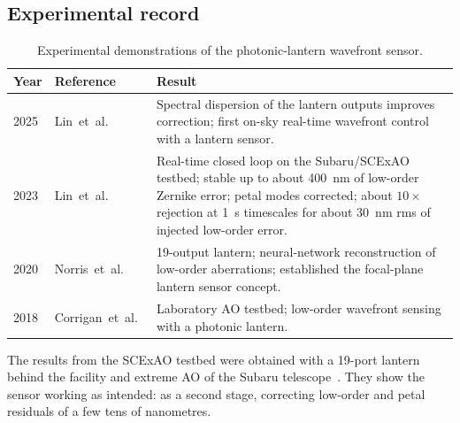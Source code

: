 \documentclass[11pt,a4paper]{article}
\begin{document}
\subsection{Experimental record}
\begin{table}[h]
\centering
\caption{Experimental demonstrations of the photonic-lantern wavefront sensor.}
\label{tab:experiments}
\small
\begin{tabular}{@{}llp{7cm}@{}}
\toprule
Year & Reference & Result \\
\midrule
2025 & Lin~et~al.~\cite{Lin2025} & Spectral dispersion of the lantern outputs improves correction; first on-sky real-time wavefront control with a lantern sensor. \\
2023 & Lin~et~al.~\cite{Lin2023PRL} & Real-time closed loop on the Subaru/SCExAO testbed; stable up to about \SI{400}{\nano\meter} of low-order Zernike error; petal modes corrected; about $10\times$ rejection at \SI{1}{\second} timescales for about \SI{30}{\nano\meter} rms of injected low-order error. \\
2020 & Norris~et~al.~\cite{Norris2020} & 19-output lantern; neural-network reconstruction of low-order aberrations; established the focal-plane lantern sensor concept. \\
2018 & Corrigan~et~al.~\cite{Corrigan2018} & Laboratory AO testbed; low-order wavefront sensing with a photonic lantern. \\
\bottomrule
\end{tabular}
\end{table}
The results from the SCExAO testbed were obtained with a 19-port lantern behind the facility and extreme AO of the Subaru telescope~\cite{Lin2023PRL,Lin2025}. They show the sensor working as intended: as a second stage, correcting low-order and petal residuals of a few tens of nanometres.
\end{document}

